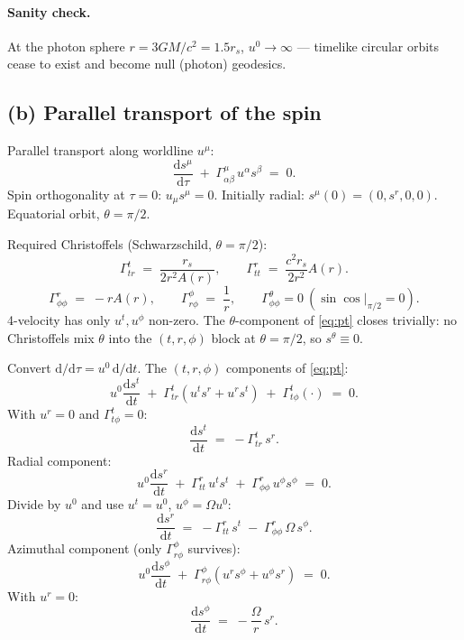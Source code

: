 \documentclass[11pt]{article}
\newcommand{\de}{\mathrm{d}}
\begin{document}
\paragraph{Sanity check.}
At the photon sphere $r=3GM/c^2 = 1.5 r_s$, $u^0\to\infty$ — timelike circular orbits cease to exist and become null (photon) geodesics.

\subsection*{(b) Parallel transport of the spin}

Parallel transport along worldline $u^\mu$:
\begin{equation}
\frac{\de s^\mu}{\de\tau} \;+\; \Gamma^{\mu}_{\alpha\beta}\,u^\alpha s^\beta \;=\; 0.
\label{eq:pt}
\end{equation}
Spin orthogonality at $\tau=0$: $u_\mu s^\mu = 0$. Initially radial: $s^\mu(0)=(0,s^r,0,0)$. Equatorial orbit, $\theta=\pi/2$.

Required Christoffels (Schwarzschild, $\theta=\pi/2$):
\[
\Gamma^{t}_{tr} \;=\; \frac{r_s}{2 r^2 A(r)},\qquad \Gamma^{r}_{tt} \;=\; \frac{c^2 r_s}{2 r^2}A(r).
\]
\[
\Gamma^{r}_{\phi\phi} \;=\; -r A(r),\qquad \Gamma^{\phi}_{r\phi} \;=\; \frac{1}{r},\qquad \Gamma^{\theta}_{\phi\phi}=0\ (\sin\cos|_{\pi/2}=0).
\]
4-velocity has only $u^t,u^\phi$ non-zero. The $\theta$-component of \eqref{eq:pt} closes trivially: no Christoffels mix $\theta$ into the $(t,r,\phi)$ block at $\theta=\pi/2$, so $s^\theta\equiv 0$. 

Convert $\de/\de\tau = u^0\,\de/\de t$. The $(t,r,\phi)$ components of \eqref{eq:pt}:
\[
u^0\frac{\de s^t}{\de t} \;+\; \Gamma^{t}_{tr}(u^t s^r + u^r s^t) \;+\; \Gamma^{t}_{t\phi}(\cdot) \;=\; 0.
\]
With $u^r=0$ and $\Gamma^t_{t\phi}=0$:
\[
\frac{\de s^t}{\de t} \;=\; -\Gamma^{t}_{tr}\,s^r.
\]
Radial component:
\[
u^0\frac{\de s^r}{\de t} \;+\; \Gamma^{r}_{tt}\,u^t s^t \;+\; \Gamma^{r}_{\phi\phi}\,u^\phi s^\phi \;=\; 0.
\]
Divide by $u^0$ and use $u^t=u^0$, $u^\phi=\Omega u^0$:
\[
\frac{\de s^r}{\de t} \;=\; -\Gamma^{r}_{tt}\,s^t \;-\; \Gamma^{r}_{\phi\phi}\,\Omega\, s^\phi.
\]
Azimuthal component (only $\Gamma^{\phi}_{r\phi}$ survives):
\[
u^0\frac{\de s^\phi}{\de t} \;+\; \Gamma^{\phi}_{r\phi}(u^r s^\phi + u^\phi s^r) \;=\; 0.
\]
With $u^r=0$:
\[
\frac{\de s^\phi}{\de t} \;=\; -\frac{\Omega}{r}\,s^r.
\]
\end{document}
